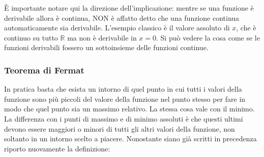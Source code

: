 È importante notare qui la direzione dell'implicazione: mentre se una funzione è derivabile allora è continua, NON è affatto detto che una funzione continua automaticamente sia derivabile. L'esempio classico è il valore assoluto di $x$, che è continuo su tutto $\mathbb{R}$ ma non è derivabile in $x = 0$. Si può vedere la cosa come se le funzioni derivabili fossero un sottoinsieme delle funzioni continue.


\subsubsection{Teorema di Fermat} \label{theorem_fermat}
In pratica basta che esista un intorno di quel punto in cui tutti i valori della funzione sono più piccoli del valore della funzione nel punto stesso per fare in modo che quel punto sia un massimo relativo. La stessa cosa vale con il minimo. La differenza con i punti di massimo e di minimo assoluti è che questi ultimi devono essere maggiori o minori di tutti gli altri valori della funzione, non soltanto in un intorno scelto a piacere. Nonostante siano già scritti in precedenza riporto nuovamente la definizione:

